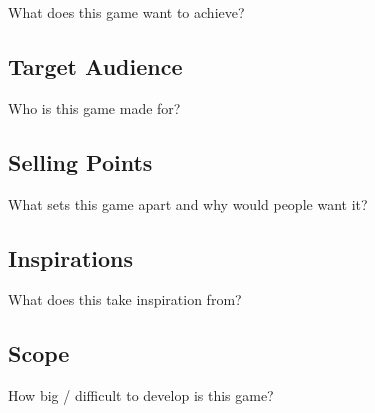 What does this game want to achieve?

\subsection{Target Audience}

Who is this game made for?

\subsection{Selling Points}

What sets this game apart and why would people want it?

\subsection{Inspirations}

What does this take inspiration from?

\subsection{Scope}

How big / difficult to develop is this game?


\newpage

\switchToAppendix
\gddChangelog



